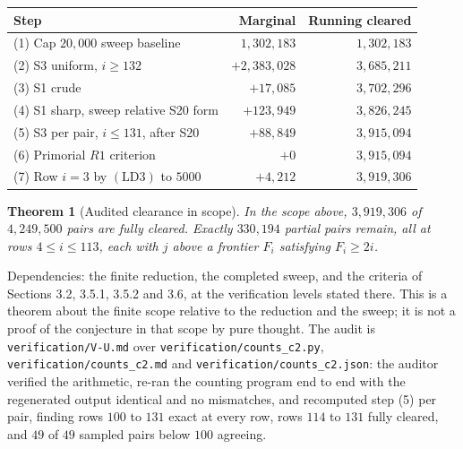 \documentclass[11pt]{article}
\newtheorem{theorem}{Theorem}[section]
\theoremstyle{remark}
\newcommand{\LDthree}{\ensuremath{\mathrm{(LD3)}}}
\begin{document}
\begin{center}
\begin{tabular}{lrr}
Step & Marginal & Running cleared\\
\hline
(1) Cap $20{,}000$ sweep baseline & $1{,}302{,}183$ & $1{,}302{,}183$\\
(2) S3 uniform, $i\ge 132$ & $+2{,}383{,}028$ & $3{,}685{,}211$\\
(3) S1 crude & $+17{,}085$ & $3{,}702{,}296$\\
(4) S1 sharp, sweep relative S20 form & $+123{,}949$ & $3{,}826{,}245$\\
(5) S3 per pair, $i\le 131$, after S20 & $+88{,}849$ & $3{,}915{,}094$\\
(6) Primorial $R1$ criterion & $+0$ & $3{,}915{,}094$\\
(7) Row $i=3$ by \LDthree{} to $5000$ & $+4{,}212$ & $3{,}919{,}306$\\
\hline
\end{tabular}
\end{center}

\begin{theorem}[Audited clearance in scope]
\label{thm:counts}
In the scope above, $3{,}919{,}306$ of $4{,}249{,}500$ pairs are fully cleared. Exactly $330{,}194$ partial pairs remain, all at rows $4\le i\le 113$, each with $j$ above a frontier $F_i$ satisfying $F_i\ge 2i$.
\end{theorem}

Dependencies: the finite reduction, the completed sweep, and the criteria of Sections 3.2, 3.5.1, 3.5.2 and 3.6, at the verification levels stated there. This is a theorem about the finite scope relative to the reduction and the sweep; it is not a proof of the conjecture in that scope by pure thought. The audit is \texttt{verification/V-U.md} over \texttt{verification/counts\_c2.py}, \texttt{verification/counts\_c2.md} and \texttt{verification/counts\_c2.json}: the auditor verified the arithmetic, re-ran the counting program end to end with the regenerated output identical and no mismatches, and recomputed step (5) per pair, finding rows $100$ to $131$ exact at every row, rows $114$ to $131$ fully cleared, and $49$ of $49$ sampled pairs below $100$ agreeing.
\end{document}
